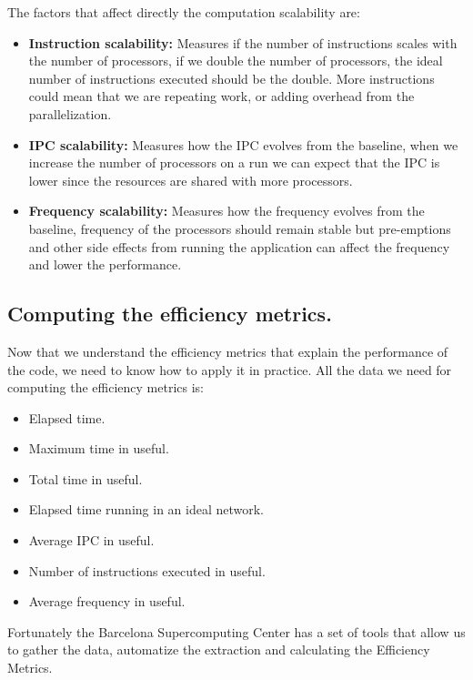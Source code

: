 The factors that affect directly the computation scalability are:
\begin{itemize}
  \item \textbf{Instruction scalability:} Measures if the number of instructions scales with the number of processors, if we double the number of processors, the ideal number of instructions executed should be the double. More instructions could mean that we are repeating work, or adding overhead from the parallelization.

  \item \textbf{IPC scalability:} Measures how the IPC evolves from the baseline, when we increase the number of processors on a run we can expect that the IPC is lower since the resources are shared with more processors. 

  \item \textbf{Frequency scalability:} Measures how the frequency evolves from the baseline, frequency of the processors should remain stable but pre-emptions and other side effects from running the application can affect the frequency and lower the performance.
\end{itemize}

\subsection{Computing the efficiency metrics.}

Now that we understand the efficiency metrics that explain the performance of the code, we need to know how to apply it in practice. All the data we need for computing the efficiency metrics is:
\begin{itemize}
  \item Elapsed time.
  \item Maximum time in useful.
  \item Total time in useful.
  \item Elapsed time running in an ideal network.
  \item Average IPC in useful.
  \item Number of instructions executed in useful.
  \item Average frequency in useful.
\end{itemize}

Fortunately the Barcelona Supercomputing Center has a set of tools that allow us to gather the data, automatize the extraction and calculating the Efficiency Metrics.
